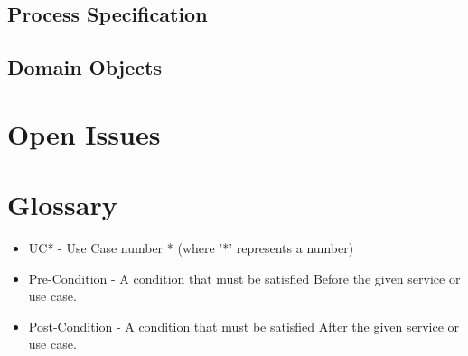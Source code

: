 \documentclass[a4paper]{article}
\begin{document}
		\subsection{Process Specification}

		\subsection{Domain Objects}

	\section{Open Issues}

	\section{Glossary}
		
		\begin{itemize}
			\item UC* - Use Case number * (where '*' represents a number)
			\item Pre-Condition - A condition that must be satisfied Before the given service or use case.
			\item Post-Condition - A condition that must be satisfied After the given service or use case.
		\end{itemize}
\end{document}
